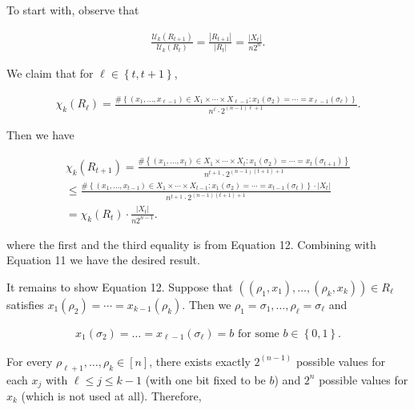 To start with, observe that\par


\[\begin{gathered}
\frac{\mathcal{U}_{k}(R_{t+1})}{\mathcal{U}_{k}(R_{t})}=\frac{|R_{t+1}|}{|R_{t}|}=\frac{|X_{t}|}{n2^{n}}.
\end{gathered}\]


We claim that for $\ell\in\left\{t,t+1\right\}$,\par


\[\begin{gathered}
\chi_{k}(R_{\ell})=\frac{\#\left\{(x_{1},\dots,x_{\ell-1})\in X_{1}\times\cdots\times X_{\ell-1}:x_{1}(\sigma_{2})=\cdots=x_{\ell-1}(\sigma_{\ell})\right\}}{n^{\ell}\cdot 2^{(n-1)\ell+1}}.
\end{gathered}\]


Then we have\par


\[\begin{gathered}
\displaystyle\chi_{k}(R_{t+1}) \displaystyle=\frac{\#\left\{(x_{1},\dots,x_{t})\in X_{1}\times\cdots\times X_{t}:x_{1}(\sigma_{2})=\cdots=x_{t}(\sigma_{t+1})\right\}}{n^{t+1}\cdot 2^{(n-1)(t+1)+1}} \\
\displaystyle\leq\frac{\#\left\{(x_{1},\dots,x_{t-1})\in X_{1}\times\cdots\times X_{t-1}:x_{1}(\sigma_{2})=\cdots=x_{t-1}(\sigma_{t})\right\}\cdot\left|X_{t}\right|}{n^{t+1}\cdot 2^{(n-1)(t+1)+1}} \\
\displaystyle=\chi_{k}(R_{t})\cdot\frac{|X_{t}|}{n2^{n-1}}.
\end{gathered}\]


where the first and the third equality is from Equation 12.
Combining with Equation 11 we have the desired result.\par




It remains to show Equation 12.
Suppose that $((\rho_{1},x_{1}),\dots,(\rho_{k},x_{k}))\in R_{\ell}$
satisfies $x_{1}(\rho_{2})=\cdots=x_{k-1}(\rho_{k})$.
Then we $\rho_{1}=\sigma_{1},\dots,\rho_{\ell}=\sigma_{\ell}$ and\par


\[\begin{gathered}
x_{1}(\sigma_{2})=\dots=x_{\ell-1}(\sigma_{\ell})=b\text{ for some $b\in\left\{0,1\right\}$.}
\end{gathered}\]


For every $\rho_{\ell+1},\dots,\rho_{k}\in[n]$, there exists
exactly $2^{(n-1)}$ possible values for each $x_{j}$ with $\ell\leq j\leq k-1$ (with one bit fixed to be $b$) and $2^{n}$ possible values for $x_{k}$ (which is not used at all).
Therefore,\par




